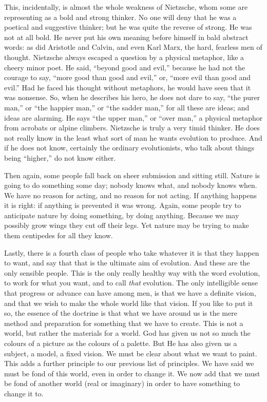 \documentclass{book}
\begin{document}
This, incidentally, is almost the whole weakness of Nietzsche, whom some are representing as a bold and strong thinker. No one will deny that he was a poetical and suggestive thinker; but he was quite the reverse of strong. He was not at all bold. He never put his own meaning before himself in bald abstract words: as did Aristotle and Calvin, and even Karl Marx, the hard, fearless men of thought. Nietzsche always escaped a question by a physical metaphor, like a cheery minor poet. He said, “beyond good and evil,” because he had not the courage to say, “more good than good and evil,” or, “more evil than good and evil.” Had he faced his thought without metaphors, he would have seen that it was nonsense. So, when he describes his hero, he does not dare to say, “the purer man,” or “the happier man,” or “the sadder man,” for all these are ideas; and ideas are alarming. He says “the upper man,” or “over man,” a physical metaphor from acrobats or alpine climbers. Nietzsche is truly a very timid thinker. He does not really know in the least what sort of man he wants evolution to produce. And if he does not know, certainly the ordinary evolutionists, who talk about things being “higher,” do not know either.

Then again, some people fall back on sheer submission and sitting still. Nature is going to do something some day; nobody knows what, and nobody knows when. We have no reason for acting, and no reason for not acting. If anything happens it is right: if anything is prevented it was wrong. Again, some people try to anticipate nature by doing something, by doing anything. Because we may possibly grow wings they cut off their legs. Yet nature may be trying to make them centipedes for all they know.

Lastly, there is a fourth class of people who take whatever it is that they happen to want, and say that that is the ultimate aim of evolution. And these are the only sensible people. This is the only really healthy way with the word evolution, to work for what you want, and to call \emph{that} evolution. The only intelligible sense that progress or advance can have among men, is that we have a definite vision, and that we wish to make the whole world like that vision. If you like to put it so, the essence of the doctrine is that what we have around us is the mere method and preparation for something that we have to create. This is not a world, but rather the materials for a world. God has given us not so much the colours of a picture as the colours of a palette. But He has also given us a subject, a model, a fixed vision. We must be clear about what we want to paint. This adds a further principle to our previous list of principles. We have said we must be fond of this world, even in order to change it. We now add that we must be fond of another world (real or imaginary) in order to have something to change it to.
\end{document}
